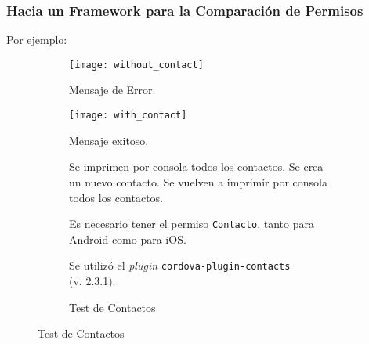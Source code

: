 \begin{frame}
 \frametitle{Hacia un Framework para la Comparación de Permisos}
Por ejemplo:
\begin{figure}[hbp]
    \centering
    \begin{subfigure}{0.28\linewidth}
        \texttt{[image: without\_contact]}
        \caption{Mensaje de Error.}
    \end{subfigure}
    \begin{subfigure}{0.28\linewidth}
        \texttt{[image: with\_contact]}
                \caption{Mensaje exitoso.}
     \end{subfigure}
	\begin{subfigure}{.42\linewidth}
	\begin{algorithm}[H]
    \scriptsize
	\begin{algorithmic}[1]
		\STATE Se imprimen por consola todos los contactos.
		\STATE Se crea un nuevo contacto.
		\STATE Se vuelven a imprimir por consola \\todos los contactos.
	\end{algorithmic}
	\caption{Test de Contactos}
   \end{algorithm}
   \begin{block}{}\small
    {Es necesario tener el permiso \texttt{Contacto}, tanto para Android como para iOS.}
   \end{block}
   \begin{block}{}\small
 {Se utilizó el \textit{plugin} \texttt{cordova-plugin-contacts} \\(v. 2.3.1).}
   \end{block}
   \end{subfigure}
    \end{figure}
\end{frame}
